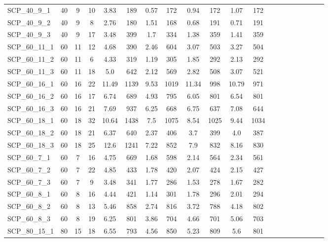 \begin{sidewaystable}[!ht]
{\begin{tabular}{lccccccccccccccccccc}
SCP\_40\_9\_1 & 40 & 9 & 10 & 3.83 & 189 &  \textcolor{blue2}{0.57} & 172 & 0.94 & 172 & 1.07 & 172 \\
SCP\_40\_9\_2 & 40 & 9 & 8 & 2.76 & 180 & 1.51 & 168 &  \textcolor{blue2}{0.68} & 191 & 0.71 & 191 \\
SCP\_40\_9\_3 & 40 & 9 & 17 & 3.48 & 399 & 1.7 & 334 &  \textcolor{blue2}{1.38} & 359 & 1.41 & 359 \\
SCP\_60\_11\_1 & 60 & 11 & 12 & 4.68 & 390 &  \textcolor{blue2}{2.46} & 604 & 3.07 & 503 & 3.27 & 504 \\
SCP\_60\_11\_2 & 60 & 11 & 6 & 4.33 & 319 &  \textcolor{blue2}{1.19} & 305 & 1.85 & 292 & 2.13 & 292 \\
SCP\_60\_11\_3 & 60 & 11 & 18 & 5.0 & 642 &  \textcolor{blue2}{2.12} & 569 & 2.82 & 508 & 3.07 & 521 \\
SCP\_60\_16\_1 & 60 & 16 & 22 & 11.49 & 1139 &  \textcolor{blue2}{9.53} & 1019 & 11.34 & 998 & 10.79 & 971 \\
SCP\_60\_16\_2 & 60 & 16 & 17 & 6.74 & 689 &  \textcolor{blue2}{4.93} & 795 & 6.05 & 801 & 6.54 & 801 \\
SCP\_60\_16\_3 & 60 & 16 & 21 & 7.69 & 937 &  \textcolor{blue2}{6.25} & 668 & 6.75 & 637 & 7.08 & 644 \\
SCP\_60\_18\_1 & 60 & 18 & 32 & 10.64 & 1438 &  \textcolor{blue2}{7.5} & 1075 & 8.54 & 1025 & 9.44 & 1034 \\
SCP\_60\_18\_2 & 60 & 18 & 21 & 6.37 & 640 &  \textcolor{blue2}{2.37} & 406 & 3.7 & 399 & 4.0 & 387 \\
SCP\_60\_18\_3 & 60 & 18 & 25 & 12.6 & 1241 &  \textcolor{blue2}{7.22} & 852 & 7.9 & 832 & 8.16 & 830 \\
SCP\_60\_7\_1 & 60 & 7 & 16 & 4.75 & 669 &  \textcolor{blue2}{1.68} & 598 & 2.14 & 564 & 2.34 & 561 \\
SCP\_60\_7\_2 & 60 & 7 & 22 & 4.85 & 433 &  \textcolor{blue2}{1.78} & 420 & 2.07 & 424 & 2.15 & 427 \\
SCP\_60\_7\_3 & 60 & 7 & 9 & 3.48 & 341 & 1.77 & 286 &  \textcolor{blue2}{1.53} & 278 & 1.67 & 282 \\
SCP\_60\_8\_1 & 60 & 8 & 16 & 4.44 & 421 &  \textcolor{blue2}{1.14} & 301 & 1.78 & 296 & 2.01 & 294 \\
SCP\_60\_8\_2 & 60 & 8 & 13 & 5.46 & 858 &  \textcolor{blue2}{2.74} & 816 & 3.72 & 788 & 4.18 & 802 \\
SCP\_60\_8\_3 & 60 & 8 & 19 & 6.25 & 801 &  \textcolor{blue2}{3.86} & 704 & 4.66 & 701 & 5.06 & 703 \\
SCP\_80\_15\_1 & 80 & 15 & 18 & 6.55 & 793 &  \textcolor{blue2}{4.56} & 850 & 5.23 & 809 & 5.6 & 801 \\

\end{tabular}}
\end{sidewaystable}
